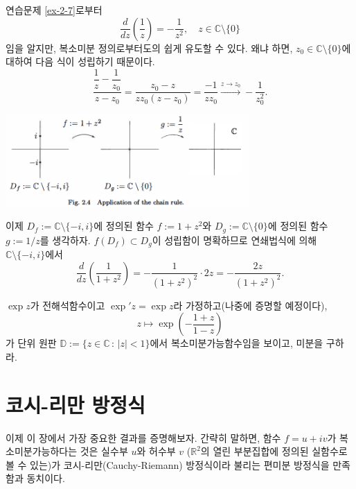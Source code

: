 \begin{saltexample}{}{} \label{example-2-4}
연습문제 \ref{ex-2-7}로부터
\[
\dfrac d{dz} \left(\dfrac 1z \right) = - \dfrac 1{z^2}, \quad
z\in \mathbb C \setminus \{0\}
\]
임을 알지만, 복소미분 정의로부터도의 쉽게 유도할 수 있다. 왜냐 하면,
$z_0\in \mathbb C \setminus \{0\}$에 대하여 다음 식이 성립하기 때문이다.
\[
\dfrac{\dfrac 1z - \dfrac1{z_0}}{z-z_0} = \dfrac{z_0 - z}{zz_0(z-z_0)}
= \dfrac{-1}{zz_0} \stackrel{z\to z_0}{\longrightarrow} - \dfrac 1{z_0^2}.
\] 
\begin{center}
\includegraphics[width=0.7\textwidth]{./SaltChapter/fig-2-4}
\end{center}
\label{fig-2-4}
이제 $D_f:=\mathbb C \setminus \{-i,i\}$에 정의된 함수 $f:= 1+z^2$와
$D_g:=\mathbb C \setminus \{0\}$에 정의된 함수 $g:=1/z$를 생각하자.
$f(D_f) \subset D_g$이 성립함이 명확하므로 연쇄법식에 의해
$\mathbb C \setminus \{-i, i\}$에서
\[
\dfrac d{dz} \left( \dfrac 1{1+z^2} \right) = - \dfrac 1{(1+z^2)^2}\cdot 2z
= - \dfrac{2z}{(1+z^2)^2}.
\]
\end{saltexample}

\begin{salt_exercise} \label{ex-2-8}
$\exp z$가 전해석함수이고 $\exp' z = \exp z$라 가정하고(나중에 증명할 예정이다),
\[
z \mapsto \exp \left( - \dfrac{1+z}{1-z} \right)
\]
가 단위 원판 $\mathbb D := \{ z \in \mathbb C \,:\, |z|<1 \}$에서
복소미분가능함수임을 보이고, 미분을 구하라.
\end{salt_exercise}

\section{코시-리만 방정식}

이제 이 장에서 가장 중요한 결과를 증명해보자.
간략히 말하면, 함수  $f=u+iv$가 복소미분가능하다는 것은
실수부 $u$와 허수부 $v$ ($\mathbb R^2$의 열린 부분집합에 정의된 실함수로 볼 수 있는)가
코시-리만(Cauchy-Riemann) 방정식이라 불리는 편미분 방정식을 만족함과 동치이다. 

